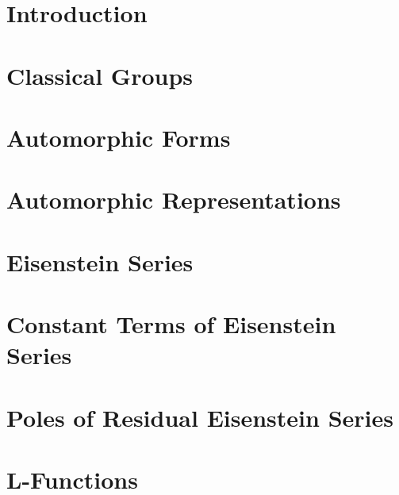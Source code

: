 \documentclass[10pt, openany]{book}
\numberwithin{equation}{section}
\begin{document}
\chapter*{Introduction}


\tableofcontents
{}

\chapter{Classical Groups}

\chapter{Automorphic Forms}

\chapter{Automorphic Representations}

\chapter{Eisenstein Series}

\chapter{Constant Terms of Eisenstein Series}

%
\chapter{Poles of Residual Eisenstein Series}



    \appendix
\chapter{L-Functions}




\newpage


\end{document}
